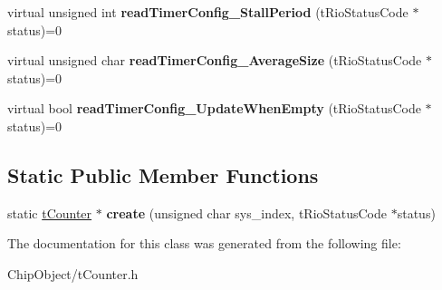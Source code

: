 \begin{DoxyCompactItemize}
\item 
\hypertarget{classnFPGA_1_1nFRC__2012__1__6__4_1_1tCounter_ac90f9b63a9e0abb54bd0fa40942f32cd}{
virtual unsigned int {\bfseries readTimerConfig\_\-StallPeriod} (tRioStatusCode $\ast$status)=0}
\label{classnFPGA_1_1nFRC__2012__1__6__4_1_1tCounter_ac90f9b63a9e0abb54bd0fa40942f32cd}

\item 
\hypertarget{classnFPGA_1_1nFRC__2012__1__6__4_1_1tCounter_ac4706141121e3f6778c9c47f4f4a52c5}{
virtual unsigned char {\bfseries readTimerConfig\_\-AverageSize} (tRioStatusCode $\ast$status)=0}
\label{classnFPGA_1_1nFRC__2012__1__6__4_1_1tCounter_ac4706141121e3f6778c9c47f4f4a52c5}

\item 
\hypertarget{classnFPGA_1_1nFRC__2012__1__6__4_1_1tCounter_ab6169c391f675ea7b8244b6fbb36513c}{
virtual bool {\bfseries readTimerConfig\_\-UpdateWhenEmpty} (tRioStatusCode $\ast$status)=0}
\label{classnFPGA_1_1nFRC__2012__1__6__4_1_1tCounter_ab6169c391f675ea7b8244b6fbb36513c}

\end{DoxyCompactItemize}
\subsection*{Static Public Member Functions}
\begin{DoxyCompactItemize}
\item 
\hypertarget{classnFPGA_1_1nFRC__2012__1__6__4_1_1tCounter_af4022f3eb7c13fa3b2e48ff026ee351a}{
static \hyperlink{classnFPGA_1_1nFRC__2012__1__6__4_1_1tCounter}{tCounter} $\ast$ {\bfseries create} (unsigned char sys\_\-index, tRioStatusCode $\ast$status)}
\label{classnFPGA_1_1nFRC__2012__1__6__4_1_1tCounter_af4022f3eb7c13fa3b2e48ff026ee351a}

\end{DoxyCompactItemize}


The documentation for this class was generated from the following file:\begin{DoxyCompactItemize}
\item 
ChipObject/tCounter.h\end{DoxyCompactItemize}

